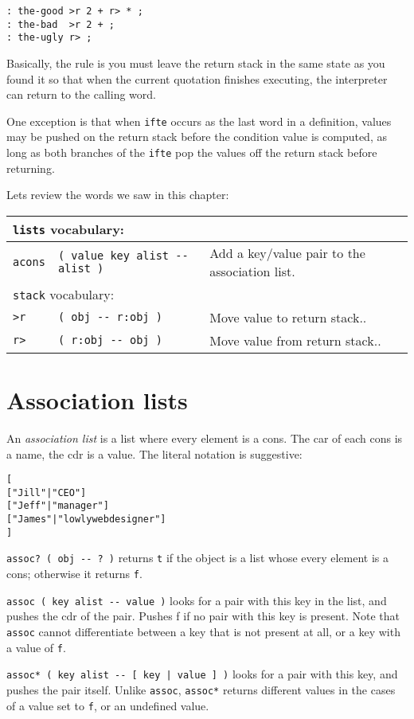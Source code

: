 \documentclass[english]{book}
\newcommand{\wordtable}[1]{{
\begin{tabularx}{12cm}{|l l X|}
#1
\hline
\end{tabularx}}}
\newcommand{\tabvocab}[1]{
\hline
\multicolumn{3}{|l|}{
\rule[-2mm]{0mm}{6mm}
\texttt{#1} vocabulary:}
\\
\hline
}
\begin{document}
\begin{verbatim}
: the-good >r 2 + r> * ;
: the-bad  >r 2 + ;
: the-ugly r> ;
\end{verbatim}

Basically, the rule is you must leave the return stack in the same state as you found it so that when the current quotation finishes executing, the interpreter can return to the calling word.

One exception is that when \texttt{ifte} occurs as the last word in a definition, values may be pushed on the return stack before the condition value is computed, as long as both branches of the \texttt{ifte} pop the values off the return stack before returning.

Lets review the words we saw in this chapter:

\wordtable{
\tabvocab{lists}
\texttt{acons}&
\texttt{( value key alist -{}- alist )}&
Add a key/value pair to the association list.\\
\tabvocab{stack}
\texttt{>r}&
\texttt{( obj -{}- r:obj )}&
Move value to return stack..\\
\texttt{r>}&
\texttt{( r:obj -{}- obj )}&
Move value from return stack..\\
}

\section{Association lists}

An \emph{association list} is a list where every element is a cons. The
car of each cons is a name, the cdr is a value. The literal notation
is suggestive:

\begin{alltt}
{[}
    {[} "Jill"  | "CEO" {]}
    {[} "Jeff"  | "manager" {]}
    {[} "James" | "lowly web designer" {]}
{]}
\end{alltt}

\texttt{assoc? ( obj -{}- ?~)} returns \texttt{t} if the object is
a list whose every element is a cons; otherwise it returns \texttt{f}.

\texttt{assoc ( key alist -{}- value )} looks for a pair with this
key in the list, and pushes the cdr of the pair. Pushes f if no pair
with this key is present. Note that \texttt{assoc} cannot differentiate between
a key that is not present at all, or a key with a value of \texttt{f}.

\texttt{assoc{*} ( key alist -{}- {[} key | value {]} )} looks for
a pair with this key, and pushes the pair itself. Unlike \texttt{assoc},
\texttt{assoc{*}} returns different values in the cases of a value
set to \texttt{f}, or an undefined value.
\end{document}
